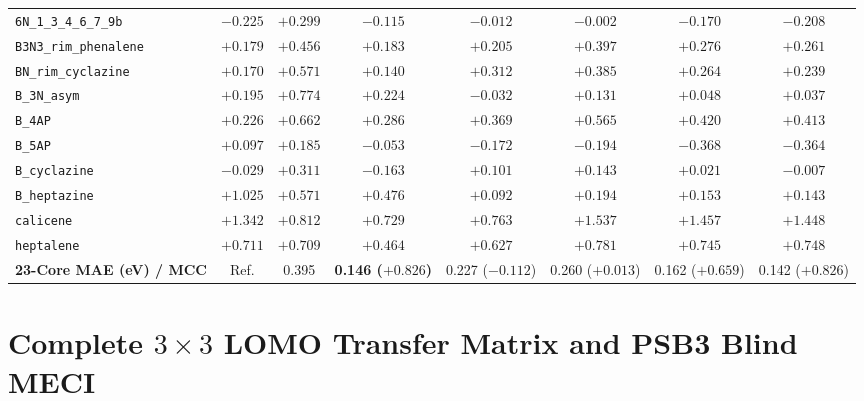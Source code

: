\documentclass[10pt,a4paper]{article}
\begin{document}
\begin{table}[htbp]
{\begin{tabular}{@{}lccccccc@{}}
\texttt{6N\_1\_3\_4\_6\_7\_9b} & $-0.225$ & $+0.299$ & $\mathbf{-0.115}$ & $-0.012$ & $-0.002$ & $-0.170$ & $-0.208$ \\
\texttt{B3N3\_rim\_phenalene} & $+0.179$ & $+0.456$ & $\mathbf{+0.183}$ & $+0.205$ & $+0.397$ & $+0.276$ & $+0.261$ \\
\texttt{BN\_rim\_cyclazine} & $+0.170$ & $+0.571$ & $\mathbf{+0.140}$ & $+0.312$ & $+0.385$ & $+0.264$ & $+0.239$ \\
\texttt{B\_3N\_asym} & $+0.195$ & $+0.774$ & $\mathbf{+0.224}$ & $-0.032$ & $+0.131$ & $+0.048$ & $+0.037$ \\
\texttt{B\_4AP} & $+0.226$ & $+0.662$ & $\mathbf{+0.286}$ & $+0.369$ & $+0.565$ & $+0.420$ & $+0.413$ \\
\texttt{B\_5AP} & $+0.097$ & $+0.185$ & $\mathbf{-0.053}$ & $-0.172$ & $-0.194$ & $-0.368$ & $-0.364$ \\
\texttt{B\_cyclazine} & $-0.029$ & $+0.311$ & $\mathbf{-0.163}$ & $+0.101$ & $+0.143$ & $+0.021$ & $-0.007$ \\
\texttt{B\_heptazine} & $+1.025$ & $+0.571$ & $\mathbf{+0.476}$ & $+0.092$ & $+0.194$ & $+0.153$ & $+0.143$ \\
\texttt{calicene} & $+1.342$ & $+0.812$ & $\mathbf{+0.729}$ & $+0.763$ & $+1.537$ & $+1.457$ & $+1.448$ \\
\texttt{heptalene} & $+0.711$ & $+0.709$ & $\mathbf{+0.464}$ & $+0.627$ & $+0.781$ & $+0.745$ & $+0.748$ \\
\midrule
\textbf{23-Core MAE (eV) / MCC} & Ref. & 0.395 & \textbf{0.146 ($+0.826$)} & 0.227 ($-0.112$) & 0.260 ($+0.013$) & 0.162 ($+0.659$) & 0.142 ($+0.826$) \\
\bottomrule
\end{tabular}}
\end{table}

\section{Complete \texorpdfstring{$3\times 3$}{3x3} LOMO Transfer Matrix and PSB3 Blind MECI}
\end{document}
